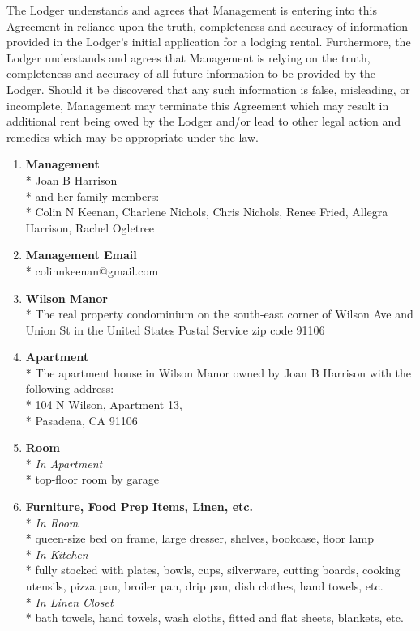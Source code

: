 \documentclass[12pt,letterpaper]{article}
\newcommand{\mom}{Joan B Harrison}
\newcommand{\management}{Management}
\newcommand{\myemail}{Management Email}
\newcommand{\condo}{Wilson Manor}
\newcommand{\apt}{Apartment}
\newcommand{\room}{Room}
\newcommand{\furniture}{Furniture, Food Prep Items, Linen, etc.}
\newcommand{\lodger}{Lodger}
\begin{document}
The \lodger{} understands and agrees that \management{} is entering into this Agreement in reliance upon the truth, completeness and accuracy of information provided in the \lodger{}'s initial application for a lodging rental. Furthermore, the \lodger{} understands and agrees that \management{} is relying on the truth, completeness and accuracy of all future information to be provided by the \lodger{}. Should it be discovered that any such information is false, misleading, or incomplete, \management{} may terminate this Agreement which may result in additional rent being owed by the \lodger{} and/or lead to other legal action and remedies which may be appropriate under the law. 

\begin{multicols}{2}
	\begin{enumerate} 
		\item \textbf{\management{}}\\* \label{management}
			\noindent \mom{}\\*
			and her family members:\\*
			Colin N Keenan,
			Charlene Nichols,
			Chris Nichols,
			Renee Fried,
			Allegra Harrison,
			Rachel Ogletree
				
		\item \textbf{\myemail{}}\\* \label{myemail}
			colinnkeenan@gmail.com

		\item \textbf{\condo{}}\\* \label{condo}
			The real property condominium on the south-east corner of Wilson Ave and Union St in the United States Postal Service zip code 91106

		\item \textbf{\apt{}}\\* \label{apt}
			The apartment house in \condo{} owned by \mom{} with the following address:\\*
			104 N Wilson, \apt{} 13,\\* 
			Pasadena, CA  91106

		\item \textbf{\room{}}\\* \label{room}
			\textit{In \apt{}}\\*
			top-floor room by garage


		\item \textbf{\furniture{}}\\* \label{furniture}
			\textit{In \room{}}\\*
			queen-size bed on frame, large dresser, shelves, bookcase, floor lamp\\*
			\textit{In Kitchen}\\*
			fully stocked with plates, bowls, cups, silverware, cutting boards, cooking utensils, pizza pan, broiler pan, drip pan, dish clothes, hand towels, etc.\\*
			\textit{In Linen Closet}\\*
			bath towels, hand towels, wash cloths, fitted and flat sheets, blankets, etc.


\end{enumerate}
\end{multicols}
\end{document}
